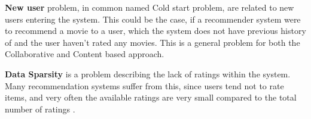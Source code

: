 \textbf{New user} problem, in common named Cold start problem, are related to new users entering the system. This could be the case, if a recommender system were to recommend a movie to a user, which the system does not have previous history of and the user haven't rated any movies. This is a general problem for both the Collaborative and Content based approach. \newline

\textbf{Data Sparsity} is a problem describing the lack of ratings within the system. Many recommendation systems suffer from this, since users tend not to rate items, and very often the available ratings are very small compared to the total number of ratings \citep[p. 19]{TowardsTheNextGenerationOfRs}. 

